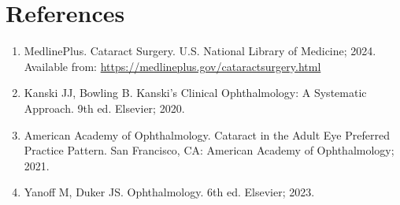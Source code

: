 \section*{References}
\begin{enumerate}
  \item MedlinePlus. Cataract Surgery. U.S. National Library of Medicine; 2024. Available from: \url{https://medlineplus.gov/cataractsurgery.html}
  \item Kanski JJ, Bowling B. Kanski's Clinical Ophthalmology: A Systematic Approach. 9th ed. Elsevier; 2020.
  \item American Academy of Ophthalmology. Cataract in the Adult Eye Preferred Practice Pattern. San Francisco, CA: American Academy of Ophthalmology; 2021.
  \item Yanoff M, Duker JS. Ophthalmology. 6th ed. Elsevier; 2023.
\end{enumerate}

\clearpage

